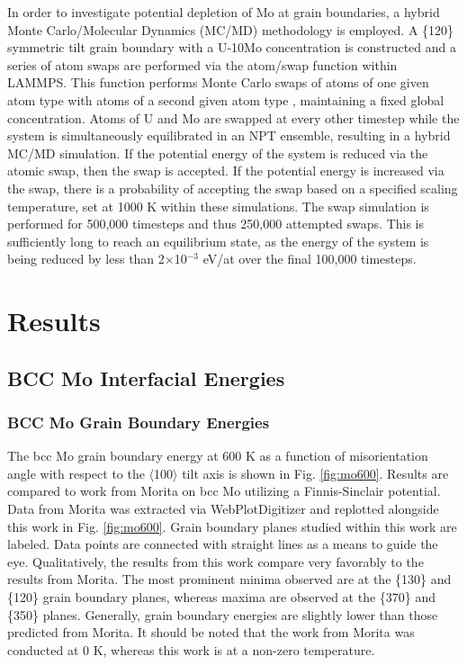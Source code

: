 \documentclass[review]{elsarticle}
\begin{document}
In order to investigate potential depletion of Mo at grain boundaries, a hybrid Monte Carlo/Molecular Dynamics (MC/MD) methodology is employed. A \{120\} symmetric tilt grain boundary with a U-10Mo concentration is constructed and a series of atom swaps are performed via the atom/swap function within LAMMPS. This function performs Monte Carlo swaps of atoms of one given atom type with atoms of a second given atom type \cite{plimpton1995}, maintaining a fixed global concentration. Atoms of U and Mo are swapped at every other timestep while the system is simultaneously equilibrated in an NPT ensemble, resulting in a hybrid MC/MD simulation. If the potential energy of the system is reduced via the atomic swap, then the swap is accepted. If the potential energy is increased via the swap, there is a probability of accepting the swap based on a specified scaling temperature, set at 1000 K within these simulations. The swap simulation is performed for 500,000 timesteps and thus 250,000 attempted swaps. This is sufficiently long to reach an equilibrium state, as the energy of the system is being reduced by less than 2$\times$10$^{-3}$ eV/at over the final 100,000 timesteps.

\section{Results}
\subsection{BCC Mo Interfacial Energies}

\subsubsection{BCC Mo Grain Boundary Energies}

The bcc Mo grain boundary energy at 600 K as a function of misorientation angle with respect to the $\langle$100$\rangle$ tilt axis is shown in Fig. \ref{fig:mo600}. Results are compared to work from Morita \cite{morita1997} on bcc Mo utilizing a Finnis-Sinclair \cite{finnis} potential. Data from Morita \cite{morita1997} was extracted via WebPlotDigitizer \cite{webplot} and replotted alongside this work in Fig. \ref{fig:mo600}. Grain boundary planes studied within this work are labeled. Data points are connected with straight lines as a means to guide the eye. Qualitatively, the results from this work compare very favorably to the results from Morita. The most prominent minima observed are at the \{130\} and \{120\} grain boundary planes, whereas maxima are observed at the \{370\} and \{350\} planes. Generally, grain boundary energies are slightly lower than those predicted from Morita. It should be noted that the work from Morita was conducted at 0 K, whereas this work is at a non-zero temperature. 
\end{document}
